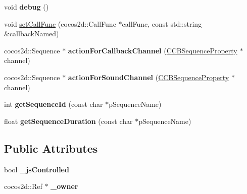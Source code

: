 \begin{DoxyCompactItemize}
\item 
\mbox{\label{classcocosbuilder_1_1CCBAnimationManager_a6a4342d79e7e9fa86de5d3d9d17e87cb}} 
void {\bfseries debug} ()
\item 
void \hyperlink{classcocosbuilder_1_1CCBAnimationManager_a98a96e47cd517ea03ed009c4c4d640e4}{set\+Call\+Func} (cocos2d\+::\+Call\+Func $\ast$call\+Func, const std\+::string \&callback\+Named)
\item 
\mbox{\label{classcocosbuilder_1_1CCBAnimationManager_a992eb0da7a217f40ef4038f388d287ed}} 
cocos2d\+::\+Sequence $\ast$ {\bfseries action\+For\+Callback\+Channel} (\hyperlink{classcocosbuilder_1_1CCBSequenceProperty}{C\+C\+B\+Sequence\+Property} $\ast$channel)
\item 
\mbox{\label{classcocosbuilder_1_1CCBAnimationManager_a917d54c00f7e93d3855cbc076d0766a9}} 
cocos2d\+::\+Sequence $\ast$ {\bfseries action\+For\+Sound\+Channel} (\hyperlink{classcocosbuilder_1_1CCBSequenceProperty}{C\+C\+B\+Sequence\+Property} $\ast$channel)
\item 
\mbox{\label{classcocosbuilder_1_1CCBAnimationManager_ab8183fce697c34a31c285c3676f9458f}} 
int {\bfseries get\+Sequence\+Id} (const char $\ast$p\+Sequence\+Name)
\item 
\mbox{\label{classcocosbuilder_1_1CCBAnimationManager_a3f5ef4d6e31fd8af7475fa23a559fd9d}} 
float {\bfseries get\+Sequence\+Duration} (const char $\ast$p\+Sequence\+Name)
\end{DoxyCompactItemize}
\subsection*{Public Attributes}
\begin{DoxyCompactItemize}
\item 
\mbox{\label{classcocosbuilder_1_1CCBAnimationManager_a1fc2e73940cef8f4cfe5a312cda0a7e3}} 
bool {\bfseries \+\_\+js\+Controlled}
\item 
\mbox{\label{classcocosbuilder_1_1CCBAnimationManager_a6925d137a1e1a33730811026105fd3af}} 
cocos2d\+::\+Ref $\ast$ {\bfseries \+\_\+owner}
\end{DoxyCompactItemize}


